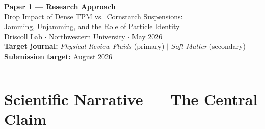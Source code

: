 \documentclass[11pt,letterpaper]{article}
\begin{document}

\begin{center}
  {\LARGE\bfseries\color{sectionblue} Paper 1 --- Research Approach}\\[6pt]
  {\large Drop Impact of Dense TPM vs.\ Cornstarch Suspensions:\\
  Jamming, Unjamming, and the Role of Particle Identity}\\[10pt]
  {\normalsize Driscoll Lab $\cdot$ Northwestern University $\cdot$ May 2026}\\[4pt]
  {\small
    \textbf{Target journal:} \textit{Physical Review Fluids} (primary) $|$
    \textit{Soft Matter} (secondary)\\
    \textbf{Submission target:} August 2026
  }
\end{center}

\vspace{4pt}
\noindent\rule{\linewidth}{0.8pt}
\vspace{4pt}

\section{Scientific Narrative --- The Central Claim}
\end{document}

